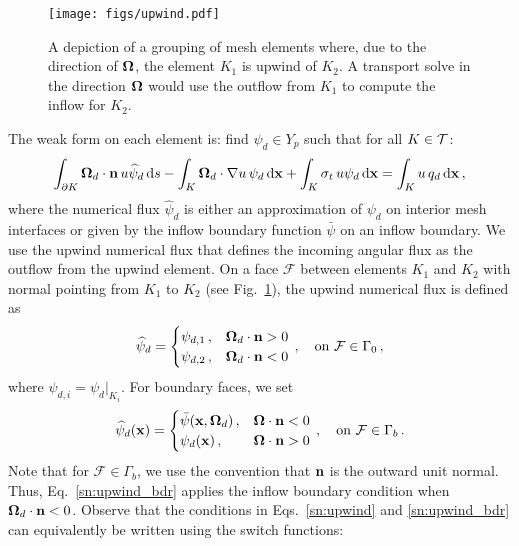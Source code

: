 \documentclass[../doc.tex]{subfiles}
\begin{document}
\begin{figure}
\centering
\texttt{[image: figs/upwind.pdf]}
\caption{A depiction of a grouping of mesh elements where, due to the direction of $\boldsymbol{\Omega}$, the element $K_1$ is upwind of $K_2$. A transport solve in the direction $\boldsymbol{\Omega}$ would use the outflow from $K_1$ to compute the inflow for $K_2$.}
\label{sn:upwind_diag}
\end{figure}
The weak form on each element is: find $\psi_d \in Y_p$ such that for all $K \in \mathcal{T}$: 
	\begin{equation}
		\int_{\partial K} \boldsymbol{\Omega}_d \cdot\boldsymbol{\mathrm{n}}\, u \widehat{\psi}_d \mathop{}\!\mathrm{d} s - \int_K \boldsymbol{\Omega}_d\cdot\nabla u \, \psi_d \mathop{}\!\mathrm{d} \boldsymbol{\mathrm{x}} + \int_K \sigma_t\, u\psi_d \mathop{}\!\mathrm{d} \boldsymbol{\mathrm{x}} = \int_K u\, q_d \mathop{}\!\mathrm{d} \boldsymbol{\mathrm{x}} \,, 
	\end{equation}
where the numerical flux $\widehat{\psi}_d$ is either an approximation of $\psi_d$ on interior mesh interfaces or given by the inflow boundary function $\bar{\psi}$ on an inflow boundary. We use the upwind numerical flux that defines the incoming angular flux as the outflow from the upwind element. On a face $\mathcal{F}$ between elements $K_1$ and $K_2$ with normal pointing from $K_1$ to $K_2$ (see Fig.~\ref{sn:upwind_diag}), the upwind numerical flux is defined as 
	\begin{equation} \label{sn:upwind}
		\widehat{\psi}_d = \begin{cases}
			\psi_{d,1} \,, & \boldsymbol{\Omega}_d\cdot\boldsymbol{\mathrm{n}} > 0 \\
			\psi_{d,2} \,, & \boldsymbol{\Omega}_d\cdot\boldsymbol{\mathrm{n}} < 0 
		\end{cases} \,, \quad \text{on}\ \mathcal{F} \in \Gamma_0 \,, 
	\end{equation}
where $\psi_{d,i} = \psi_d|_{K_i}$. For boundary faces, we set 
	\begin{equation} \label{sn:upwind_bdr}
		\widehat{\psi}_d(\boldsymbol{\mathrm{x}}) = \begin{cases}
			\bar{\psi}(\boldsymbol{\mathrm{x}},\boldsymbol{\Omega}_d) \,, & \boldsymbol{\Omega}\cdot\boldsymbol{\mathrm{n}} < 0 \\
			\psi_d(\boldsymbol{\mathrm{x}}) \,, & \boldsymbol{\Omega}\cdot\boldsymbol{\mathrm{n}} > 0 
		\end{cases} \,, \quad \text{on}\ \mathcal{F} \in \Gamma_b \,. 
	\end{equation}
Note that for $\mathcal{F} \in \Gamma_b$, we use the convention that $\boldsymbol{\mathrm{n}}$ is the outward unit normal. Thus, Eq.~\ref{sn:upwind_bdr} applies the inflow boundary condition when $\boldsymbol{\Omega}_d\cdot\boldsymbol{\mathrm{n}}<0$. Observe that the conditions in Eqs.~\ref{sn:upwind} and \ref{sn:upwind_bdr} can equivalently be written using the switch functions: 
\end{document}
